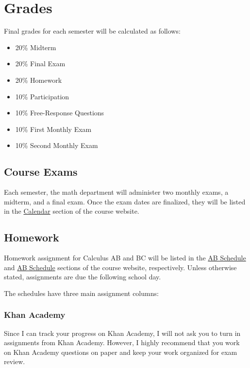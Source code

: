 \documentclass[12pt,fleqn]{article}
\providecommand{\tightlist}{%
  \setlength{\itemsep}{0pt}\setlength{\parskip}{0pt}}
\begin{document}
\hypertarget{grades}{%
\section{Grades}\label{grades}}

Final grades for each semester will be calculated as follows:

\begin{itemize}
\tightlist
\item
  20\% Midterm
\item
  20\% Final Exam
\item
  20\% Homework
\item
  10\% Participation
\item
  10\% Free-Response Questions
\item
  10\% First Monthly Exam
\item
  10\% Second Monthly Exam
\end{itemize}

\hypertarget{course-exams}{%
\subsection{Course Exams}\label{course-exams}}

Each semester, the math department will administer two monthly exams, a midterm, and a final exam. Once the exam dates are finalized, they will be listed in the \href{https://ap-calculus.github.io/calendar/2019-2020.html}{Calendar} section of the course website.

\hypertarget{homework}{%
\subsection{Homework}\label{homework}}

Homework assignment for Calculus AB and BC will be listed in the \href{https://ap-calculus.github.io/ab}{AB Schedule} and \href{https://ap-calculus.github.io/bc}{AB Schedule} sections of the course website, respectively. Unless otherwise stated, assignments are due the following school day.

The schedules have three main assignment columns:

\hypertarget{khan-academy}{%
\subsubsection{Khan Academy}\label{khan-academy}}

Since I can track your progress on Khan Academy, I will not ask you to turn in assignments from Khan Academy. However, I highly recommend that you work on Khan Academy questions on paper and keep your work organized for exam review.
\end{document}
